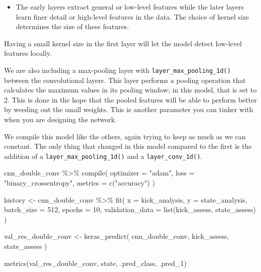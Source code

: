 \documentclass[
]{krantz}
\makeatletter
\newenvironment{Shaded}{\begin{snugshade}}{\end{snugshade}}
\newcommand{\AttributeTok}[1]{\textcolor[rgb]{0.77,0.63,0.00}{#1}}
\newcommand{\DecValTok}[1]{\textcolor[rgb]{0.00,0.00,0.81}{#1}}
\newcommand{\FunctionTok}[1]{\textcolor[rgb]{0.00,0.00,0.00}{#1}}
\newcommand{\NormalTok}[1]{#1}
\newcommand{\OtherTok}[1]{\textcolor[rgb]{0.56,0.35,0.01}{#1}}
\newcommand{\SpecialCharTok}[1]{\textcolor[rgb]{0.00,0.00,0.00}{#1}}
\newcommand{\StringTok}[1]{\textcolor[rgb]{0.31,0.60,0.02}{#1}}
\newenvironment{kframe}{%
\medskip{}
\setlength{\fboxsep}{.8em}
 \def\at@end@of@kframe{}%
 \ifinner\ifhmode%
  \def\at@end@of@kframe{\end{minipage}}%
  \begin{minipage}{\columnwidth}%
 \fi\fi%
 \def\FrameCommand##1{\hskip\@totalleftmargin \hskip-\fboxsep
 \colorbox{shadecolor}{##1}\hskip-\fboxsep
     \hskip-\linewidth \hskip-\@totalleftmargin \hskip\columnwidth}%
 \MakeFramed {\advance\hsize-\width
   \@totalleftmargin\z@ \linewidth\hsize
   \@setminipage}}%
 {\par\unskip\endMakeFramed%
 \at@end@of@kframe}
\renewenvironment{Shaded}{\begin{kframe}}{\end{kframe}}
\newenvironment{rmdblock}[1]
  {\begin{shaded*}
  \begin{itemize}[left = -1cm, labelsep = 1cm]
  \renewcommand{\labelitemi}{
    \raisebox{-.7\height}[0pt][0pt]{
      {\setkeys{Gin}{width=3em,keepaspectratio}\texttt{[image: images/\#1]}}
    }
  }
 
  \item
  }
  {
  \end{itemize}
  \end{shaded*}
  }
\newenvironment{rmdnote}
  {\begin{rmdblock}{note}}
  {\end{rmdblock}}
\makeatother
\begin{document}
\begin{rmdnote}
The early layers extract general or low-level features while the later
layers learn finer detail or high-level features in the data. The choice
of kernel size determines the size of these features.
\end{rmdnote}

Having a small kernel size in the first layer will let the model detect low-level features locally.

We are also including a max-pooling layer with \texttt{layer\_max\_pooling\_1d()} between the convolutional layers. This layer performs a pooling operation that calculates the maximum values in its pooling window; in this model, that is set to 2.
This is done in the hope that the pooled features will be able to perform better by weeding out the small weights.
This is another parameter you can tinker with when you are designing the network.

We compile this model like the others, again trying to keep as much as we can constant. The only thing that changed in this model compared to the first is the addition of a \texttt{layer\_max\_pooling\_1d()} and a \texttt{layer\_conv\_1d()}.

\begin{Shaded}
\begin{Highlighting}[]
\NormalTok{cnn\_double\_conv }\SpecialCharTok{\%\textgreater{}\%} \FunctionTok{compile}\NormalTok{(}
  \AttributeTok{optimizer =} \StringTok{"adam"}\NormalTok{,}
  \AttributeTok{loss =} \StringTok{"binary\_crossentropy"}\NormalTok{,}
  \AttributeTok{metrics =} \FunctionTok{c}\NormalTok{(}\StringTok{"accuracy"}\NormalTok{)}
\NormalTok{)}

\NormalTok{history }\OtherTok{\textless{}{-}}\NormalTok{ cnn\_double\_conv }\SpecialCharTok{\%\textgreater{}\%} \FunctionTok{fit}\NormalTok{(}
  \AttributeTok{x =}\NormalTok{ kick\_analysis,}
  \AttributeTok{y =}\NormalTok{ state\_analysis,}
  \AttributeTok{batch\_size =} \DecValTok{512}\NormalTok{,}
  \AttributeTok{epochs =} \DecValTok{10}\NormalTok{,}
  \AttributeTok{validation\_data =} \FunctionTok{list}\NormalTok{(kick\_assess, state\_assess)}
\NormalTok{)}
\end{Highlighting}
\end{Shaded}

\begin{Shaded}
\begin{Highlighting}[]
\NormalTok{val\_res\_double\_conv }\OtherTok{\textless{}{-}} \FunctionTok{keras\_predict}\NormalTok{(}
\NormalTok{  cnn\_double\_conv,}
\NormalTok{  kick\_assess,}
\NormalTok{  state\_assess}
\NormalTok{)}

\FunctionTok{metrics}\NormalTok{(val\_res\_double\_conv, state, .pred\_class, .pred\_1)}
\end{Highlighting}
\end{Shaded}
\end{document}
